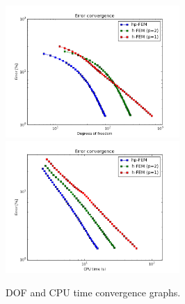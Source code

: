 \begin{figure}[!ht]
\centering
\includegraphics[height=5cm]{nist/nist-7/conv_dof_aniso.png}\ \
\includegraphics[height=5cm]{nist/nist-7/conv_cpu_aniso.png}
\caption{DOF and CPU time convergence graphs.}
\label{fig:nist-7-conv}
\end{figure}

